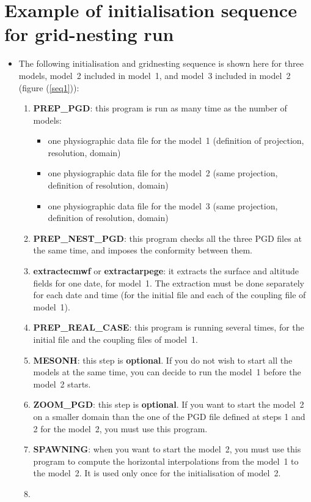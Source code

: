 \chapter{Example of initialisation sequence for grid-nesting run}\label{a:sequence}
\begin{itemize}
\item The following initialisation and gridnesting sequence is shown here for
 three models, model~2 included in model~1, and model~3 included in model~2
(figure (\ref{seq1})):
\begin{enumerate}
\item
{\bf PREP\_PGD}: this program is run as many time as the number of models:
\begin{itemize}
\item one physiographic data file for the model~1 (definition of projection, resolution, domain)
\item one physiographic data file for the model~2 (same projection, definition of resolution, domain)
\item one physiographic data file for the model~3 (same projection, definition of resolution, domain)
\end{itemize}
\item
{\bf PREP\_NEST\_PGD}: this program checks all the three PGD files at the same
 time, and imposes the conformity between them.
\item
{\bf extractecmwf} or {\bf extractarpege}: it extracts the surface
and altitude fields for one date, for model~1.
The extraction must be done separately for each date and time (for
the initial file and each of the coupling file of model~1).
\item 
{\bf PREP\_REAL\_CASE}: this program is running several times, for the initial
file and the coupling files of model~1.
\item 
{\bf MESONH}: this step is {\bf optional}. If you do not wish to start 
all the models at the same time, you can decide to run the model~1 before
the model~2 starts.
\item
{\bf ZOOM\_PGD}: this step is {\bf optional}. If you want to start the model~2 
on a smaller domain than the one of the PGD file defined at
steps 1 and 2 for the model~2, you must use this program.
\item
{\bf SPAWNING}: when you want to start the model~2, you must use this
program to compute the horizontal interpolations from the model~1 to 
the model~2. It is used only once for the initialisation of model~2.
\item 

\end{enumerate}
\end{itemize}
